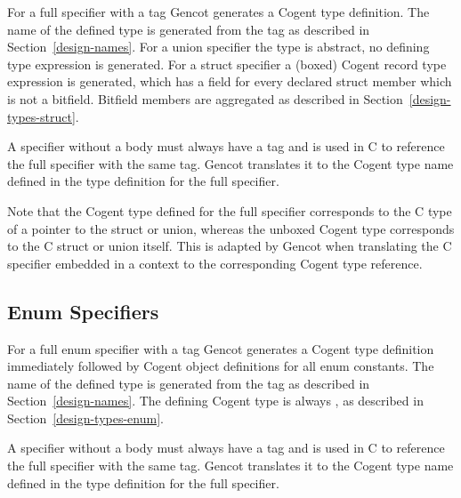 For a full specifier with a tag Gencot generates a Cogent type definition. The name of the defined type is generated
from the tag as described in Section~\ref{design-names}. For a union specifier the type is abstract, no defining type
expression is generated. For a struct specifier a (boxed) Cogent record type expression is generated, which has a field
for every declared struct member which is not a bitfield. Bitfield members are aggregated as described in 
Section~\ref{design-types-struct}. 

A specifier without a body must always have a tag and is used in C to reference the full specifier with the same tag.
Gencot translates it to the Cogent type name defined in the type definition for the full specifier.

Note that the Cogent type defined for the full specifier corresponds to the C type of a pointer to the struct or union, 
whereas the unboxed Cogent type corresponds to the C struct or union itself. This is adapted by Gencot when translating
the C specifier embedded in a context to the corresponding Cogent type reference.

\subsection{Enum Specifiers}

For a full enum specifier with a tag Gencot generates a Cogent type definition immediately followed by Cogent object
definitions for all enum constants. The name of the defined type is generated
from the tag as described in Section~\ref{design-names}. The defining Cogent type is always , as described in
Section~\ref{design-types-enum}. 

A specifier without a body must always have a tag and is used in C to reference the full specifier with the same tag.
Gencot translates it to the Cogent type name defined in the type definition for the full specifier.

 
